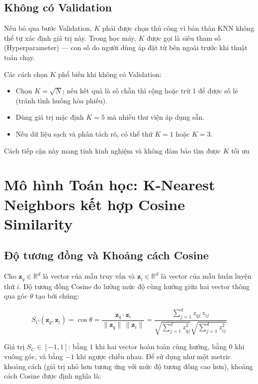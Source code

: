 \documentclass[12pt,a4paper]{article}
\begin{document}
\subsection{Không có Validation}

Nếu bỏ qua bước Validation, $K$ phải được chọn thủ công vì bản thân KNN không thể tự xác định giá trị này. Trong học máy, $K$ được gọi là siêu tham số (Hyperparameter) — con số do người dùng áp đặt từ bên ngoài trước khi thuật toán chạy.

Các cách chọn $K$ phổ biến khi không có Validation:
\begin{itemize}
    \item Chọn $K = \sqrt{N}$; nếu kết quả là số chẵn thì cộng hoặc trừ 1 để được số lẻ (tránh tình huống hòa phiếu).
    \item Dùng giá trị mặc định $K = 5$ mà nhiều thư viện áp dụng sẵn.
    \item Nếu dữ liệu sạch và phân tách rõ, có thể thử $K = 1$ hoặc $K = 3$.
\end{itemize}

Cách tiếp cận này mang tính kinh nghiệm và không đảm bảo tìm được $K$ tối ưu

\section{Mô hình Toán học: K-Nearest Neighbors kết hợp Cosine Similarity}
\subsection{Độ tương đồng và Khoảng cách Cosine}

Cho $\mathbf{z}_q \in \mathbb{R}^d$ là vector của mẫu truy vấn và
$\mathbf{z}_i \in \mathbb{R}^d$ là vector của mẫu huấn luyện thứ $i$.
Độ tương đồng Cosine đo lường mức độ cùng hướng giữa hai vector thông
qua góc $\theta$ tạo bởi chúng:

\begin{equation}
    S_C(\mathbf{z}_q, \mathbf{z}_i)
    = \cos\theta
    = \frac{\mathbf{z}_q \cdot \mathbf{z}_i}
           {\|\mathbf{z}_q\|\,\|\mathbf{z}_i\|}
    = \frac{\displaystyle\sum_{j=1}^{d} z_{qj}\,z_{ij}}
           {\displaystyle\sqrt{\sum_{j=1}^{d} z_{qj}^2}
            \sqrt{\sum_{j=1}^{d} z_{ij}^2}}
\end{equation}

Giá trị $S_C \in [-1, 1]$: bằng $1$ khi hai vector hoàn toàn cùng hướng,
bằng $0$ khi vuông góc, và bằng $-1$ khi ngược chiều nhau. Để sử dụng
như một metric khoảng cách (giá trị nhỏ hơn tương ứng với mức độ tương
đồng cao hơn), khoảng cách Cosine được định nghĩa là:
\end{document}
